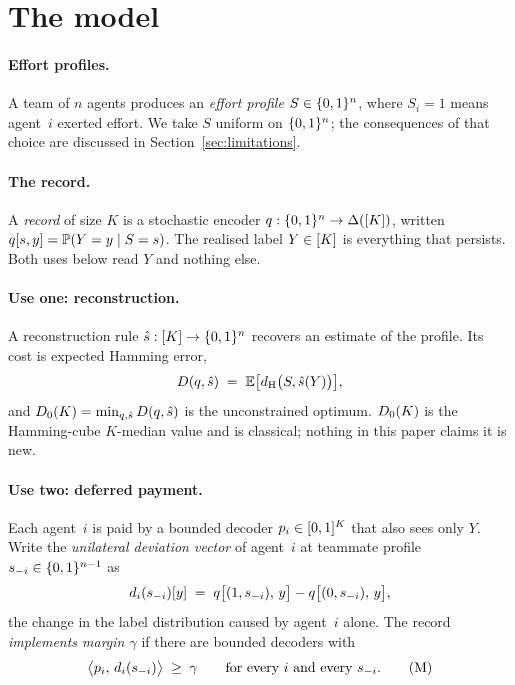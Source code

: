 \section{The model}
\label{sec:model}

\paragraph{Effort profiles.}
A team of $n$ agents produces an \emph{effort profile} $S \in \{0,1\}^n$, where
$S_i = 1$ means agent~$i$ exerted effort. We take $S$ uniform on $\{0,1\}^n$; the
consequences of that choice are discussed in Section~\ref{sec:limitations}.

\paragraph{The record.}
A \emph{record} of size $K$ is a stochastic encoder
$q : \{0,1\}^n \to \Delta([K])$, written $q[s,y] = \mathbb{P}(Y = y \mid S = s)$.
The realised label $Y \in [K]$ is everything that persists. Both uses below
read $Y$ and nothing else.

\paragraph{Use one: reconstruction.}
A reconstruction rule $\hat{s} : [K] \to \{0,1\}^n$ recovers an estimate of the
profile. Its cost is expected Hamming error,
\[
  D(q,\hat{s}) \;=\; \mathbb{E}\bigl[d_{\mathrm{H}}\bigl(S, \hat{s}(Y)\bigr)\bigr],
\]
and $D_0(K) = \min_{q,\hat{s}} D(q,\hat{s})$ is the unconstrained optimum.
$D_0(K)$ is the Hamming-cube $K$-median value and is classical; nothing in
this paper claims it is new.

\paragraph{Use two: deferred payment.}
Each agent~$i$ is paid by a bounded decoder $p_i \in [0,1]^K$ that also sees
only $Y$. Write the \emph{unilateral deviation vector} of agent~$i$ at teammate
profile $s_{-i} \in \{0,1\}^{n-1}$ as
\[
  d_i(s_{-i})[y] \;=\; q\bigl[(1,s_{-i}),\,y\bigr] - q\bigl[(0,s_{-i}),\,y\bigr],
\]
the change in the label distribution caused by agent~$i$ alone. The record
\emph{implements margin $\gamma$} if there are bounded decoders with
\[
  \bigl\langle p_i,\, d_i(s_{-i}) \bigr\rangle \;\ge\; \gamma
  \qquad \text{for every } i \text{ and every } s_{-i} .
\tag{M}\label{eq:margin}
\]

